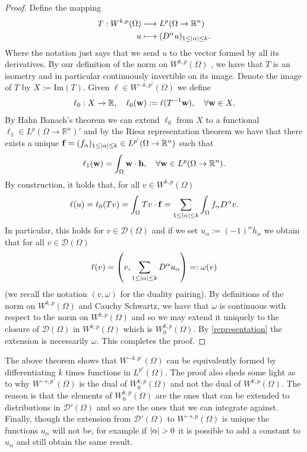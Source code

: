 \documentclass[
    a4paper,
    DIV=14,
    abstract=true,
    numbers=noenddot
]
{scrartcl}
\theoremstyle{definition}
\newcommand{\rm}[1]{\mathrm{#1}}
\newcommand{\R}{\mathbb{R}}
\newcommand{\Dd}{\mathcal{D}}
\begin{document}
\begin{proof}
  Define the mapping
  \begin{align*}
    T: W^{k,p}(\Omega ) & \longrightarrow L^p(\Omega \to \R^n)                \\
    u                   & \longmapsto(D^\alpha u)_{1 \leq\abs{\alpha}\leq k}.
  \end{align*}
  Where the notation just says that we send $u$ to the vector formed by all its derivatives. By our definition of the norm on $W^{k,p}(\Omega )$ , we have that $T$ is an isometry and in particular continuously invertible on its image. Denote the image of $T$ by $X:=\rm{Im}(T)$. Given $\ell \in W^{-k,p'}(\Omega )$ we define
  \begin{align*}
    \ell_0: X \to \R, \quad \ell_0(\vb{w}):= \ell(T^{-1}\vb{w}), \quad \forall \vb{w} \in X.
  \end{align*}
  By Hahn Banach's theorem we can extend $\ell_0$ from $X$ to a functional $\ell_1 \in  L^p(\Omega \to \R^n)'$ and by the Riesz representation theorem we have that there exists a unique $\vb{f}=(f_\alpha)_{1\leq \abs{\alpha}\leq k }\in L^{p'}(\Omega \to \R^n)$ such that
  \begin{align*}
    \ell_1(\vb{w})=\int_{\Omega}\vb{w}\cdot \vb{h}, \quad \forall \vb{w} \in L^p(\Omega \to \R^n).
  \end{align*}
  By construction, it holds that, for all $v \in W^{k,p}(\Omega )$
  \begin{align*}
    \ell(u)=\ell_0(Tv)=\int_{\Omega}Tv\cdot \vb{f}=\sum_{1\leq\left| \alpha \right|\leq k}\int_{\Omega}f_\alpha D^\alpha v .
  \end{align*}
  In particular, this holds for $v \in \Dd(\Omega )$ and if we set $u_\alpha:=(-1)^\alpha h_\alpha$ we obtain that for all $v \in \Dd(\Omega )$
  \begin{align}\label{representation}
    \ell(v)=\left(v,\sum_{1\leq\left| \alpha \right|\leq k} D^\alpha u_\alpha\right)=: \omega(v)
  \end{align}
  (we recall the notation $(v,\omega)$ for the duality pairing). By definitions of the norm on $W^{k,p}(\Omega )$ and Cauchy Schwartz, we have that $\omega$ is continuous with respect to the norm on $W^{k,p}(\Omega )$ and so we may extend it uniquely to the closure of $\Dd(\Omega )$ in $W^{k,p}(\Omega )$ which is $W^{k,p}_0(\Omega )$. By \eqref{representation} the extension is necessarily $\omega$. This completes the proof.
\end{proof}
The above theorem shows that $W^{-k,p'}(\Omega )$ can be equivalently formed by differentiating $k$ times functions in $L^{p'}(\Omega )$. The proof also sheds some light as to why $W^{-s,p'}(\Omega )$ is the dual of $W^{k,p}_0(\Omega )$ and not the dual of $W^{k,p}(\Omega )$. The reason is that the elements of $W^{k,p}_0(\Omega )$ are the ones that can be extended to distributions in $\Dd'(\Omega )$ and so are the ones that we can integrate against. Finally, though the extension from $\Dd'(\Omega )$ to $W^{-s,p}(\Omega )$ is unique the functions $u_\alpha$ will not be, for example if $\abs{\alpha}>0$ it is possible to add a constant to $u_\alpha$ and still obtain the same result.
\end{document}
